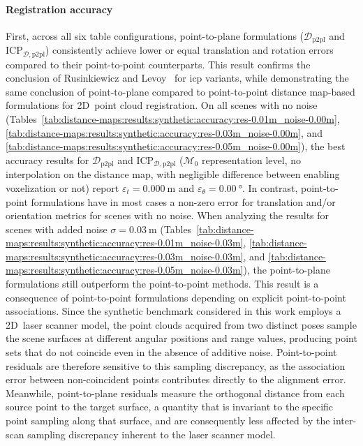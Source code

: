 \paragraph{Registration accuracy}
First, across all six table configurations, point-to-plane formulations
($\mathcal{D}_\mathrm{p2pl}$ and $\mathrm{ICP}_{\mathcal{D},\mathrm{p2pl}}$)
consistently achieve lower or equal translation and rotation errors compared to
their point-to-point counterparts. This result confirms the conclusion of
Rusinkiewicz and Levoy~\cite{rusinkiewicz-levoy:im:2001} for \gls{icp} variants,
while demonstrating the same conclusion of point-to-plane compared to
point-to-point distance map-based formulations for 2D~point cloud registration.
On all scenes with no noise
(Tables~\ref{tab:distance-maps:results:synthetic:accuracy:res-0.01m_noise-0.00m},
\ref{tab:distance-maps:results:synthetic:accuracy:res-0.03m_noise-0.00m}, and
\ref{tab:distance-maps:results:synthetic:accuracy:res-0.05m_noise-0.00m}),
the best accuracy results for $\mathcal{D}_\mathrm{p2pl}$ and
$\mathrm{ICP}_{\mathcal{D},\mathrm{p2pl}}$ ($\mathcal{M}_0$ representation
level, no interpolation on the distance map, with negligible difference between
enabling voxelization or not) report $\varepsilon_t=\SI{0.000}{\metre}$ and
$\varepsilon_\theta=\SI{0.00}{\degree}$.
In contrast, point-to-point formulations have in most cases a non-zero error
for translation and/or orientation metrics for scenes with no noise.
When analyzing the results for scenes with added noise
$\sigma=\SI{0.03}{\metre}$
(Tables~\ref{tab:distance-maps:results:synthetic:accuracy:res-0.01m_noise-0.03m},
\ref{tab:distance-maps:results:synthetic:accuracy:res-0.03m_noise-0.03m}, and
\ref{tab:distance-maps:results:synthetic:accuracy:res-0.05m_noise-0.03m}),
the point-to-plane formulations still outperform the point-to-point methods.
This result is a consequence of point-to-point formulations depending on
explicit point-to-point associations. Since the synthetic benchmark considered
in this work employs a 2D~laser scanner model, the point clouds acquired from
two distinct poses sample the scene surfaces at different angular positions
and range values, producing point sets that do not coincide even in the absence
of additive noise. Point-to-point residuals are therefore sensitive to this
sampling discrepancy, as the association error between non-coincident points
contributes directly to the alignment error.
Meanwhile, point-to-plane residuals measure the orthogonal distance from
each source point to the target surface, a quantity that is invariant to
the specific point sampling along that surface, and are consequently less
affected by the inter-scan sampling discrepancy inherent to the laser
scanner model.

